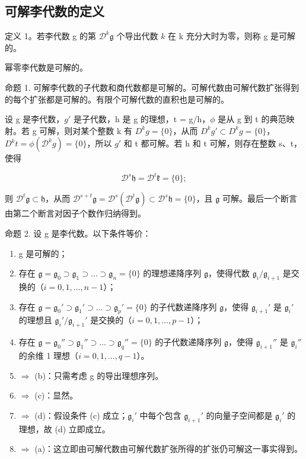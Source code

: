 \subsection{可解李代数的定义}

定义 1。若李代数 g 的第 \(\mathcal{D}^{k}\mathfrak{g}\) 个导出代数 \(k\) 在 k 充分大时为零，则称 g 是可解的。

幂零李代数是可解的。

命题 1. 可解李代数的子代数和商代数都是可解的。可解代数由可解代数扩张得到的每个扩张都是可解的。有限个可解代数的直积也是可解的。

设 g 是李代数，\(g'\) 是子代数，h 是 g 的理想，t = g/h，\(\phi\) 是从 g 到 t 的典范映射。若 g 可解，则对某个整数 k 有 \(D^{k}g = \{0\}\)，从而 \(D^{k}g' \subset D^{k}g = \{0\}\)，\(D^{k}t = \phi(\mathcal{D}^{k}g) = \{0\}\)，所以 \(g'\) 和 t 都可解。若 h 和 t 可解，则存在整数 s、t，使得

\[
\mathcal {D} ^ {s} \mathfrak {h} = \mathcal {D} ^ {t} \mathfrak {k} = \{0 \};
\]

则 \(\mathcal{D}^t\mathfrak{g}\subset \mathfrak{h}\)，从而 \(\mathcal{D}^{s + t}\mathfrak{g} = \mathcal{D}^{s}(\mathcal{D}^{t}\mathfrak{g})\subset \mathcal{D}^{s}\mathfrak{h} = \{0\}\)，且 \(\mathfrak{g}\) 可解。最后一个断言由第二个断言对因子个数作归纳得到。

命题 2. 设 g 是李代数。以下条件等价：

\begin{enumerate}
\def\labelenumi{(\alph{enumi})}
\item
  g 是可解的；
\item
  存在 \(\mathfrak{g} = \mathfrak{g}_0 \supset \mathfrak{g}_1 \supset \dots \supset \mathfrak{g}_n = \{0\}\) 的理想递降序列 \(\mathfrak{g}\)，使得代数 \(\mathfrak{g}_i / \mathfrak{g}_{i+1}\) 是交换的（\(i = 0, 1, \ldots, n-1\)）；
\item
  存在 \(\mathfrak{g} = \mathfrak{g}_0' \supset \mathfrak{g}_1' \supset \dots \supset \mathfrak{g}_p' = \{0\}\) 的子代数递降序列 \(\mathfrak{g}\)，使得 \(\mathfrak{g}_{i+1}'\) 是 \(\mathfrak{g}_i'\) 的理想且 \(\mathfrak{g}_i'/\mathfrak{g}_{i+1}'\) 是交换的（\(i = 0, 1, \ldots, p - 1\)）；
\item
  存在 \(\mathfrak{g} = \mathfrak{g}_0'' \supset \mathfrak{g}_1'' \supset \dots \supset \mathfrak{g}_q'' = \{0\}\) 的子代数递降序列 \(\mathfrak{g}\)，使得 \(\mathfrak{g}_{i+1}''\) 是 \(\mathfrak{g}_i''\) 的余维 1 理想（\(i = 0, 1, \ldots, q - 1\)）。
\item
  \(\Rightarrow\) (b)：只需考虑 g 的导出理想序列。
\item
  \(\Rightarrow\) (c)：显然。
\item
  \(\Rightarrow\) (d)：假设条件 (c) 成立；\(\mathfrak{g}_i'\) 中每个包含 \(\mathfrak{g}_{i+1}'\) 的向量子空间都是 \(\mathfrak{g}_i'\) 的理想，故 (d) 立即成立。
\item
  \(\Rightarrow\) (a)：这立即由可解代数由可解代数扩张所得的扩张仍可解这一事实得到。
\end{enumerate}

